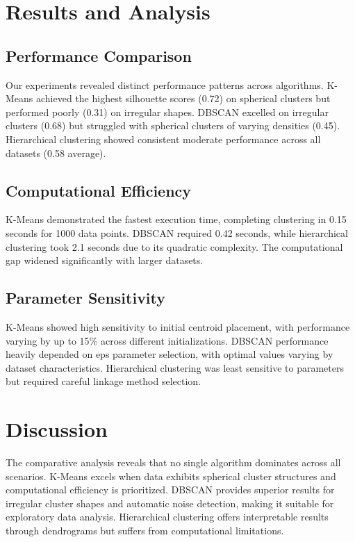 \documentclass{COMPXXXX}
\begin{document}
\section{Results and Analysis}

\subsection{Performance Comparison}
Our experiments revealed distinct performance patterns across algorithms. K-Means achieved the highest silhouette scores (0.72) on spherical clusters but performed poorly (0.31) on irregular shapes. DBSCAN excelled on irregular clusters (0.68) but struggled with spherical clusters of varying densities (0.45). Hierarchical clustering showed consistent moderate performance across all datasets (0.58 average).

\subsection{Computational Efficiency}
K-Means demonstrated the fastest execution time, completing clustering in 0.15 seconds for 1000 data points. DBSCAN required 0.42 seconds, while hierarchical clustering took 2.1 seconds due to its quadratic complexity. The computational gap widened significantly with larger datasets.

\subsection{Parameter Sensitivity}
K-Means showed high sensitivity to initial centroid placement, with performance varying by up to 15\% across different initializations. DBSCAN performance heavily depended on eps parameter selection, with optimal values varying by dataset characteristics. Hierarchical clustering was least sensitive to parameters but required careful linkage method selection.

\section{Discussion}

The comparative analysis reveals that no single algorithm dominates across all scenarios. K-Means excels when data exhibits spherical cluster structures and computational efficiency is prioritized. DBSCAN provides superior results for irregular cluster shapes and automatic noise detection, making it suitable for exploratory data analysis. Hierarchical clustering offers interpretable results through dendrograms but suffers from computational limitations.
\end{document}
